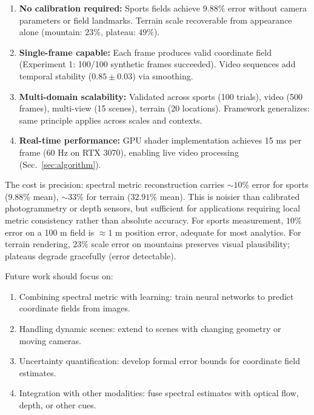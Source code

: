 \documentclass[11pt,twocolumn,a4paper]{article}
\theoremstyle{definition}
\begin{document}
\begin{enumerate}[leftmargin=1.4em]
  \item \textbf{No calibration required:} Sports fields achieve $9.88\%$ error without camera parameters or field landmarks. Terrain scale recoverable from appearance alone (mountain: $23\%$, plateau: $49\%$).
  \item \textbf{Single-frame capable:} Each frame produces valid coordinate field (Experiment 1: 100/100 synthetic frames succeeded). Video sequences add temporal stability ($0.85 \pm 0.03$) via smoothing.
  \item \textbf{Multi-domain scalability:} Validated across sports (100 trials), video (500 frames), multi-view (15 scenes), terrain (20 locations). Framework generalizes: same principle applies across scales and contexts.
  \item \textbf{Real-time performance:} GPU shader implementation achieves 15 ms per frame (60 Hz on RTX 3070), enabling live video processing (Sec.~\ref{sec:algorithm}).
\end{enumerate}

The cost is precision: spectral metric reconstruction carries $\sim 10\%$ error for sports ($9.88\%$ mean), $\sim 33\%$ for terrain ($32.91\%$ mean). This is noisier than calibrated photogrammetry or depth sensors, but sufficient for applications requiring local metric consistency rather than absolute accuracy. For sports measurement, $10\%$ error on a 100 m field is $\approx 1$ m position error, adequate for most analytics. For terrain rendering, $23\%$ scale error on mountains preserves visual plausibility; plateaus degrade gracefully (error detectable).

Future work should focus on:

\begin{enumerate}[leftmargin=1.4em]
  \item Combining spectral metric with learning: train neural networks to predict coordinate fields from images.
  \item Handling dynamic scenes: extend to scenes with changing geometry or moving cameras.
  \item Uncertainty quantification: develop formal error bounds for coordinate field estimates.
  \item Integration with other modalities: fuse spectral estimates with optical flow, depth, or other cues.
\end{enumerate}

\end{document}
